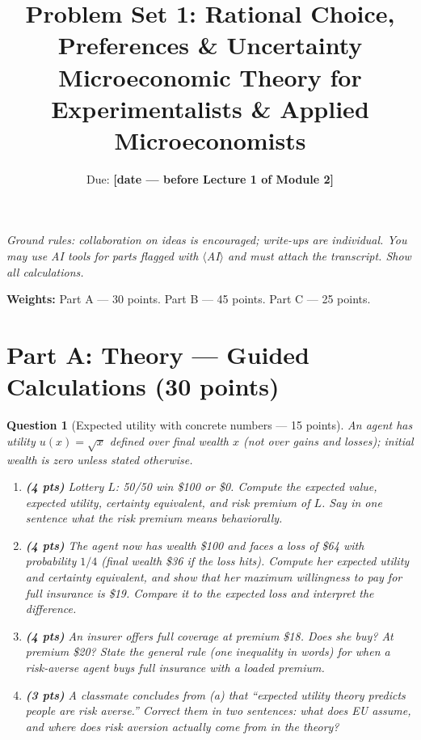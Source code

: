 \documentclass[11pt]{article}
\title{Problem Set 1: Rational Choice, Preferences \& Uncertainty\\
\large Microeconomic Theory for Experimentalists \& Applied Microeconomists}
\author{Due: \textbf{[date --- before Lecture 1 of Module 2]}}
\date{}
\newtheorem{question}{Question}
\begin{document}
\maketitle

\noindent\emph{Ground rules: collaboration on ideas is encouraged; write-ups
are individual. You may use AI tools for parts flagged with
$\langle$AI$\rangle$ and must attach the transcript. Show all calculations.}

\medskip

\noindent\textbf{Weights:} Part A --- 30 points. Part B --- 45 points.
Part C --- 25 points.

\bigskip

\section*{Part A: Theory --- Guided Calculations (30 points)}

\begin{question}[Expected utility with concrete numbers --- 15 points]
An agent has utility $u(x) = \sqrt{x}$ defined over \emph{final wealth}
$x$ (not over gains and losses); initial wealth is zero unless stated
otherwise.

\begin{enumerate}[label=(\alph*)]
  \item \textbf{(4 pts)} Lottery $L$: 50/50 win \$100 or \$0. Compute the
        expected value, expected utility, certainty equivalent, and risk
        premium of $L$. Say in one sentence what the risk premium
        \emph{means} behaviorally.
  \item \textbf{(4 pts)} The agent now has wealth \$100 and faces a loss of
        \$64 with probability $1/4$ (final wealth \$36 if the loss hits).
        Compute her expected utility and certainty equivalent, and show
        that her maximum willingness to pay for full insurance is \$19.
        Compare it to the expected loss and interpret the difference.
  \item \textbf{(4 pts)} An insurer offers full coverage at premium \$18.
        Does she buy? At premium \$20? State the general rule (one
        inequality in words) for when a risk-averse agent buys full
        insurance with a loaded premium.
  \item \textbf{(3 pts)} A classmate concludes from (a) that ``expected
        utility theory predicts people are risk averse.'' Correct them in
        two sentences: what does EU assume, and where does risk aversion
        actually come from in the theory?
\end{enumerate}
\end{question}
\end{document}
